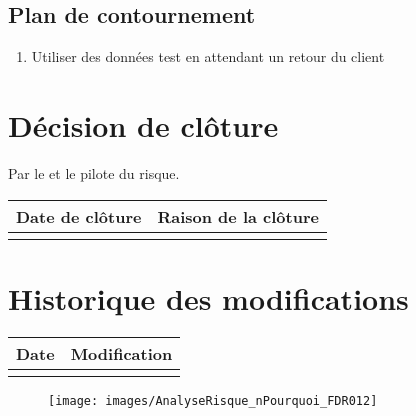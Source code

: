 \flushleft
\subsection*{Plan de contournement}

\begin{enumerate}
	\item Utiliser des données test en attendant un retour du client
\end{enumerate}

\section*{Décision de clôture}
Par le \CP{} et le pilote du risque.
\begin{table}[H]
\centering
	\begin{tabularx}{16.8cm}{|X|X|}
	\hline
	\rowcolor{gray!40} Date de clôture & Raison de la clôture \\
	\hline
	  & \\
	\hline
	\end{tabularx}
\end{table}

\section*{Historique des modifications}
\begin{table}[H]
\centering
	\begin{tabularx}{16.8cm}{|X|X|}
	\hline
	Date & Modification \\
	\hline
	  & \\
	\hline
	\end{tabularx}
\end{table}
\newpage

\begin{landscape}
\begin{figure}
	\centering
	\texttt{[image: images/AnalyseRisque\_nPourquoi\_FDR012]}
\end{figure}
\end{landscape}